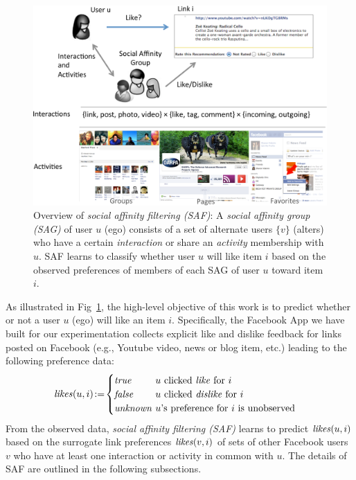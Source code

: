 
\begin{figure}[t!]
\centering
\includegraphics[width=1\linewidth]{data/overview}
\caption{Overview of \emph{social affinity filtering (SAF)}: A
  \emph{social affinity group (SAG)} of user $u$ (ego) consists of a
  set of alternate users $\{ v \}$ (alters) who have a certain
  \emph{interaction} or share an \emph{activity} membership with $u$.
  SAF learns to classify whether user $u$ will like item $i$ based on
  the observed preferences of members of each SAG of user $u$
  toward item $i$.}
\label{fig:overview}
\end{figure}

As illustrated in Fig~\ref{fig:overview}, the high-level objective of
this work is to predict whether or not a user $u$ (ego) will like an item
$i$.  Specifically, the Facebook App
we have built for our experimentation collects explicit like and
dislike feedback for links posted on Facebook
(e.g., Youtube video, news or blog item, etc.) leading to the following
preference data:
\begin{align*}
\like(u,i) & \! := \! 
          \begin{cases}
	  \true    \!\! & \!\! \text{$u$ clicked \emph{like} for $i$}\\
	  \false   \!\! & \!\! \text{$u$ clicked \emph{dislike} for $i$}\\
          \unknown \!\! & \!\! \text{$u$'s preference for $i$ is unobserved}
	  \end{cases}
\end{align*}
From the observed data, \emph{social affinity filtering (SAF)}
learns to predict $\like(u,i)$ based on the surrogate link
preferences $\like(v,i)$ of sets of other Facebook users $v$ who have
at least one interaction or activity in common with $u$.  The details
of SAF are outlined in the following subsections.

